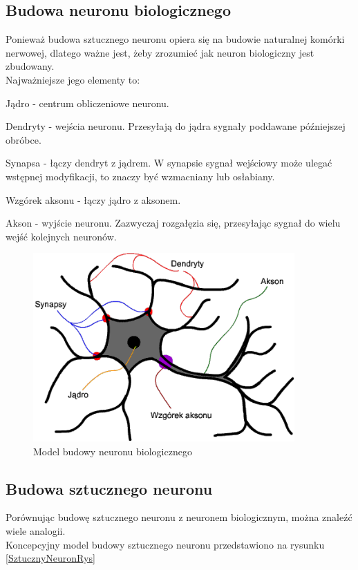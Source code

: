 \subsection{Budowa neuronu biologicznego}
Ponieważ budowa sztucznego neuronu opiera się na budowie naturalnej komórki nerwowej, dlatego ważne jest, żeby zrozumieć jak neuron biologiczny jest zbudowany. \\
Najważniejsze jego elementy to:
\begin{itemize*}
\item Jądro - centrum obliczeniowe neuronu.
\item Dendryty - wejścia neuronu. Przesyłają do jądra sygnały poddawane późniejszej obróbce.
\item Synapsa - łączy dendryt z jądrem. W synapsie sygnał wejściowy może ulegać wstępnej modyfikacji, to znaczy być wzmacniany lub osłabiany.
\item Wzgórek aksonu - łączy jądro z aksonem.
\item Akson - wyjście neuronu. Zazwyczaj rozgałęzia się, przesyłając sygnał do wielu wejść kolejnych neuronów.
\end{itemize*}

\begin{figure}[h]
\begin{center}
\includegraphics[width=10cm]{resources/figures/natural_neuron.png}
\caption{Model budowy neuronu biologicznego}
\end{center}
\end{figure}
\label{NaturalNeuronRys}

\newpage
\subsection{Budowa sztucznego neuronu}
Porównując budowę sztucznego neuronu z neuronem biologicznym, można znaleźć wiele analogii. \\
Koncepcyjny model budowy sztucznego neuronu przedstawiono na rysunku \ref{SztucznyNeuronRys}

